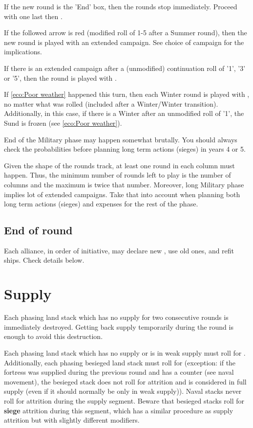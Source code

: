 If the new round is the 'End' box, then the rounds stop immediately. Proceed
with one last  then .

If the followed arrow is red (modified roll of 1-5 after a Summer round), then
the new round is played with an extended campaign. See choice of campaign for
the implications.

If there is an extended campaign after a (unmodified) continuation roll of
'1', '3' or '5', then the round is played with .

If \ref{eco:Poor weather} happened this turn, then each Winter round is played
with , no matter what was rolled (included after a
Winter/Winter transition). Additionally, in this case, if there is a Winter
after an unmodified roll of '1', the Sund is frozen (see \ref{eco:Poor
  weather}).

\begin{playtip}
  End of the Military phase may happen somewhat brutally. You should always
  check the probabilities before planning long term actions (sieges) in years
  4 or 5.

  Given the shape of the rounds track, at least one round in each column must
  happen. Thus, the minimum number of rounds left to play is the number of
  columns and the maximum is twice that number. Moreover, long Military phase
  implies lot of extended campaigns. Take that into account when planning both
  long term actions (sieges) and expenses for the rest of the phase.
\end{playtip}

\subsection{End of round}
Each alliance, in order of initiative, may declare new , use old ones, and refit  ships. Check details below.

\section{Supply}
\label{chMilitary:Supply}
Each phasing land stack which has no supply for two consecutive rounds is
immediately destroyed. Getting back supply temporarily during the round is
enough to avoid this destruction.

Each phasing land stack which has no supply or is in weak supply must roll for
. Additionally, each phasing besieged land stack must
roll for  (exception: if the fortress was supplied
during the previous round and has a \SUPPLY counter (see naval movement),
the besieged stack does not roll for attrition and is considered in full
supply (even if it should normally be only in weak supply)). Naval stacks
never roll for attrition during the supply segment. Beware that besieged
stacks roll for \textbf{siege} attrition during this segment, which has a
similar procedure as supply attrition but with slightly different modifiers.

